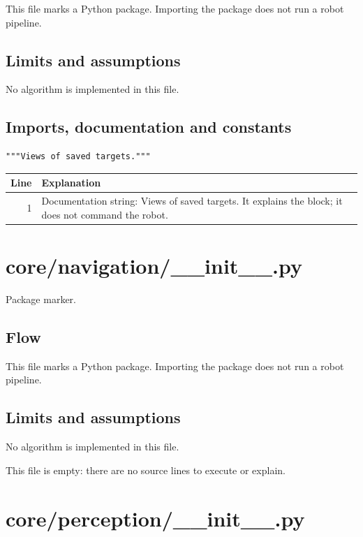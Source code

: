 \documentclass[11pt,a4paper]{book}
\begin{document}
This file marks a Python package. Importing the package does not run a robot pipeline.

\section*{Limits and assumptions}

No algorithm is implemented in this file.

\section{Imports, documentation and constants}

\begin{lstlisting}[firstnumber=1]
"""Views of saved targets."""
\end{lstlisting}

\begin{longtable}{r p{}}

\textbf{Line} & \textbf{Explanation} \\ \hline \endhead

1 & Documentation string: Views of saved targets. It explains the block; it does not command the robot. \\

\end{longtable}

\chapter{core/navigation/\_\_init\_\_.py}

Package marker.

\section*{Flow}

This file marks a Python package. Importing the package does not run a robot pipeline.

\section*{Limits and assumptions}

No algorithm is implemented in this file.

This file is empty: there are no source lines to execute or explain.

\chapter{core/perception/\_\_init\_\_.py}
\end{document}
